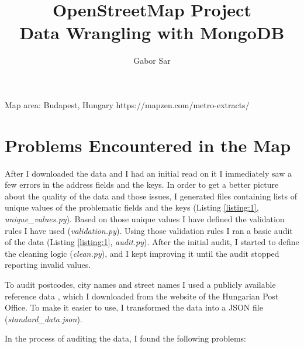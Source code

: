 \documentclass{article}
\title{OpenStreetMap Project \\ Data Wrangling with MongoDB}
\author{Gabor Sar}
\begin{document}
\maketitle

\begin{multicols}{2}


\noindent
\begin{flushleft}
Map area: Budapest, Hungary \break
https://mapzen.com/metro-extracts/
\end{flushleft}


\section{Problems Encountered in the Map}

After I downloaded the data and I had an initial read on it I immediately saw a few errors in the address fields and the keys. In order to get a better picture about the quality of the data and those issues, I generated files containing lists of unique values of the problematic fields and the keys (Listing \ref{listing:1}, \textit{unique\_values.py}). Based on those unique values I have defined the validation rules I have used (\textit{validation.py}). Using those validation rules I ran a basic audit of the data (Listing \ref{listing:1}, \textit{audit.py}). After the initial audit, I started to define the cleaning logic (\textit{clean.py}), and I kept improving it until the audit stopped reporting invalid values.

To audit postcodes, city names and street names I used a publicly available reference data \cite{HungarianPostcodes:2015}, which I downloaded from the website of the Hungarian Post Office. To make it easier to use, I transformed the data into a JSON file (\textit{standard\_data.json}).

In the process of auditing the data, I found the following problems:


\end{multicols}
\end{document}
